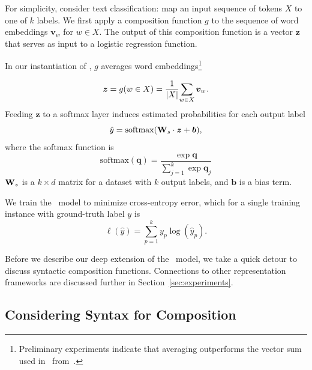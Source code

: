 For simplicity, consider text classification: map an input sequence
of tokens $X$ to one of $k$ labels.  We first apply a composition
function $g$ to the sequence of word embeddings $\boldsymbol{v}_w$ for $w\in X$.
The output of this composition function is a vector $\boldsymbol{z}$ that serves
as input to a logistic regression function.





In our instantiation of \nbow, $g$ averages word embeddings\footnote{Preliminary
  experiments indicate that averaging outperforms the vector sum used in
 \nbow\ from~.}


\begin{equation}\label{eq:ave}
\boldsymbol{z} = g(w \in X) = \frac 1 {| X |} {\sum_{w \in X} \boldsymbol{v}_w}.
\end{equation}
Feeding $\boldsymbol{z}$ to a softmax layer induces estimated probabilities for each output label
\begin{equation}\label{eq:2}
	\hat y = \mbox{softmax}(\text{\textbf{W}}_s\cdot \boldsymbol{z} + \boldsymbol{b}),
\end{equation}
where the softmax function is
\begin{equation}\label{eq:softmax}
	\mbox{softmax}(\boldsymbol{q}) =  \frac{\exp{\boldsymbol{q}}}{\sum_{j=1}^k \exp{\boldsymbol{q}_j}}
\end{equation}
$\text{\textbf{W}}_s$ is a $k\times d$ matrix for a dataset with $k$ output
labels, and $\boldsymbol{b}$ is a bias term.




We train the \nbow\ model to minimize cross-entropy error, which for a single
training instance with ground-truth label $y$ is
\begin{equation}\label{eq:crossent}
	\ell (\hat y) = \sum\limits_{p=1}^k y_p\log(\hat y_p).
\end{equation}

Before we describe our deep extension of the \nbow\ model, we take a quick
detour to discuss syntactic composition functions.  Connections to other
representation frameworks are discussed further in Section~\ref{sec:experiments}.

\subsection{Considering Syntax for Composition}\label{sec:syntax}








